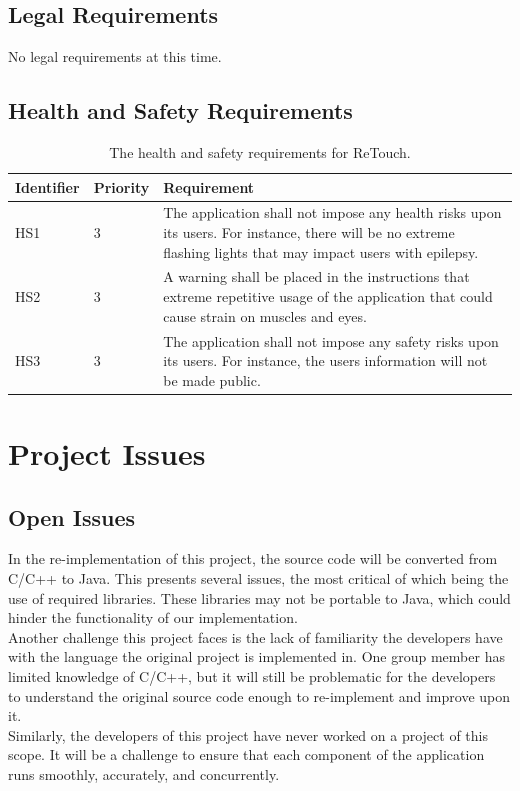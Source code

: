 \documentclass[12pt, titlepage]{article}
\begin{document}
\subsection{Legal Requirements}

{\color{cyan}No legal requirements at this time.}

\subsection{Health and Safety Requirements}

\begin{table}[H]
  \caption{The health and safety requirements for ReTouch.}
\begin{tabular}{ |m{2cm}|m{1.8cm}|m{9.4cm}| }
    \hline
    \textbf{Identifier} & \textbf{Priority} & \textbf{Requirement} \\ 
    \hline
    {\color{cyan}HS1} & 3 & {\color{cyan}The application shall not impose any health risks upon its users. For instance, there will be no extreme flashing lights that may impact users with epilepsy. }\\
    \hline
     {\color{cyan}HS2} & 3 & {\color{cyan}A warning shall be placed in the instructions that extreme repetitive usage of the application that could cause strain on muscles and eyes.} \\
    \hline
    {\color{cyan}HS3} & 3 & {\color{cyan}The application shall not impose any safety risks upon its users. For instance, the users information will not be made public.} \\
    \hline
\end{tabular}
\end{table}

\section{Project Issues}
\subsection{Open Issues}
\indent \indent In the re-implementation of this project, the source code will be converted from C/C++ to Java. This presents several issues, the most critical of which being the use of required libraries. These libraries may not be portable to Java, which could hinder the functionality of our implementation. 
\\
\indent Another challenge this project faces is the lack of familiarity the developers have with the language the original project is implemented in. One group member has limited knowledge of C/C++, but it will still be problematic for the developers to understand the original source code enough to re-implement and improve upon it.
\\
\indent Similarly, the developers of this project have never worked on a project of this scope. It will be a challenge to ensure that each component of the application runs smoothly, accurately, and concurrently.
\end{document}
